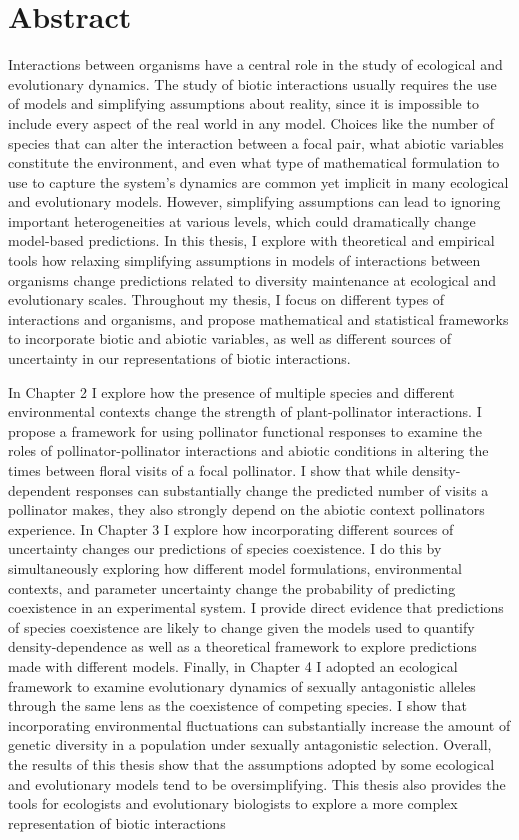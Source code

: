 \chapter*{Abstract}
\small
Interactions between organisms have a central role in the study of ecological and evolutionary dynamics. The study of biotic interactions usually requires the use of models and simplifying assumptions about reality, since it is impossible to include every aspect of the real world in any model.  Choices like the number of species that can alter the interaction between a focal pair, what abiotic variables constitute the environment, and even what type of mathematical formulation to use to capture the system's dynamics are common yet implicit in many ecological and evolutionary models. However, simplifying assumptions can lead to ignoring important heterogeneities at various levels, which could dramatically change model-based predictions. In this thesis, I explore with theoretical and empirical tools how relaxing simplifying assumptions in models of interactions between organisms change predictions related to diversity maintenance at ecological and evolutionary scales. Throughout my thesis, I focus on different types of interactions and organisms, and propose mathematical and statistical frameworks to incorporate biotic and abiotic variables, as well as different sources of uncertainty in our representations of biotic interactions.


In Chapter 2 I explore how the presence of multiple species and different environmental contexts change the strength of plant-pollinator interactions. I propose a framework for using pollinator functional responses to examine the roles of pollinator-pollinator interactions and abiotic conditions in altering the times between floral visits of a focal pollinator. I show that while density-dependent responses can substantially change the predicted number of visits a pollinator makes, they also strongly depend on the abiotic context pollinators experience. In Chapter 3  I explore how incorporating different sources of uncertainty changes our predictions of species coexistence. I do this by simultaneously exploring how different model formulations, environmental contexts, and parameter uncertainty change the probability of predicting coexistence in an experimental system. I provide direct evidence that predictions of species coexistence are likely to change given the models used to quantify density-dependence as well as a theoretical framework to explore predictions made with different models. Finally, in Chapter 4  I adopted an ecological framework to examine evolutionary dynamics of sexually antagonistic alleles through the same lens as the coexistence of competing species. I show that incorporating environmental fluctuations can substantially increase the amount of genetic diversity in a population under sexually antagonistic selection. Overall, the results of this thesis show that the assumptions adopted by some ecological and evolutionary models tend to be oversimplifying. This thesis also provides the tools for ecologists and evolutionary biologists to explore a more complex representation of biotic interactions
